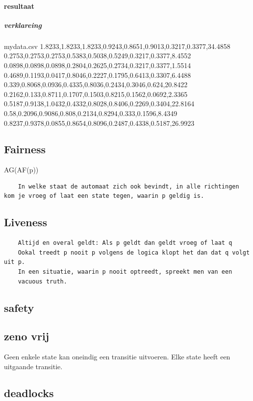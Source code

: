  
\paragraph{resultaat}


 
 
 
 
\subparagraph{verklareing}


\begin{filecontents*}{mydata.csv}
	1.8233,1.8233,1.8233,0.9243,0.8651,0.9013,0.3217,0.3377,34.4858
	0.2753,0.2753,0.2753,0.5383,0.5038,0.5249,0.3217,0.3377,8.4552
	0.0898,0.0898,0.0898,0.2804,0.2625,0.2734,0.3217,0.3377,1.5514
	0.4689,0.1193,0.0417,0.8046,0.2227,0.1795,0.6413,0.3307,6.4488
	0.339,0.8068,0.0936,0.4335,0.8036,0.2434,0.3046,0.624,20.8422
	0.2162,0.133,0.8711,0.1707,0.1503,0.8215,0.1562,0.0692,2.3365
	0.5187,0.9138,1.0432,0.4332,0.8028,0.8406,0.2269,0.3404,22.8164
	0.58,0.2096,0.9086,0.808,0.2134,0.8294,0.333,0.1596,8.4349
	0.8237,0.9378,0.0855,0.8654,0.8096,0.2487,0.4338,0.5187,26.9923 
\end{filecontents*}

\subsection{Fairness}
AG(AF(p))
\begin{verbatim}
	In welke staat de automaat zich ook bevindt, in alle richtingen kom je vroeg of laat een state tegen, waarin p geldig is.
\end{verbatim}
\subsection{Liveness}
\begin{verbatim}
	Altijd en overal geldt: Als p geldt dan geldt vroeg of laat q
	Ookal treedt p nooit p volgens de logica klopt het dan dat q volgt uit p.
	In een situatie, waarin p nooit optreedt, spreekt men van een
	vacuous truth.
\end{verbatim}

 

\subsection{safety}

\subsection{zeno vrij}
Geen enkele state kan oneindig een transitie uitvoeren. Elke state heeft een uitgaande transitie.

\subsection{deadlocks}
 





